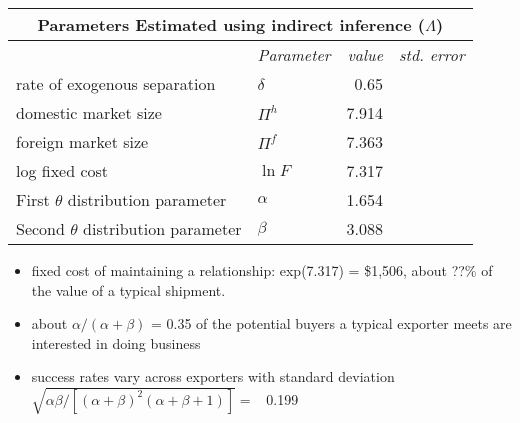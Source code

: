 \documentclass[notes=show]{beamer}
\begin{document}
\begin{frame}%


\begin{center}
{\small 
\begin{tabular}{llrr}
\hline\hline
\multicolumn{4}{c}{\textbf{Parameters Estimated using indirect inference (}$%
\Lambda $\textbf{)}} \\ \hline
                                        & \textit{Parameter} & \textit{value} & \textit{std. error} \\ \cline{2-4}
rate of exogenous separation            & $\delta $          & 0.65           &                     \\
domestic market size                    & $\Pi ^{h}$         & 7.914          &                     \\
foreign market size                     & $\Pi ^{f}$         & 7.363          &                     \\
log fixed cost                          & $\ln F$            & 7.317          &                     \\
First $\theta $ distribution parameter  & $\alpha $          & 1.654          &                     \\
Second $\theta $ distribution parameter & $\beta $           & 3.088          &                     \\ \hline
\end{tabular}%
}
\end{center}

\begin{itemize}
\item {\small fixed cost of maintaining a relationship: exp(7.317) =
\$1,506, about ??\% of the value of a typical shipment.}

\item {\small about }$\alpha /(\alpha +\beta )$ {\small = 0.35 of the
potential buyers a typical exporter meets are interested in doing business}

\item {\small success rates vary across exporters with standard deviation\ }$%
\sqrt{\alpha \beta /\left[ (\alpha +\beta )^{2}(\alpha +\beta +1)\right] }=$%
{\small \ 0.199}
\end{itemize}

\end{frame}%
\end{document}
